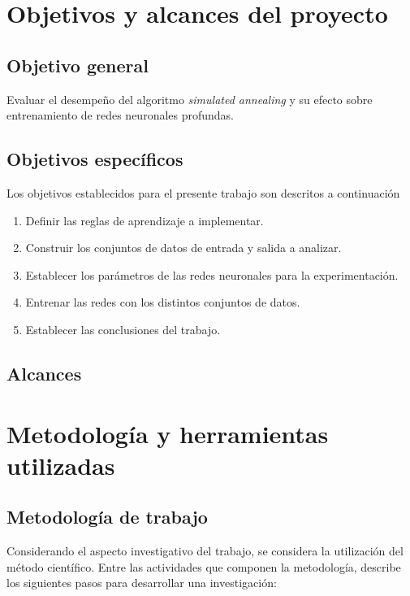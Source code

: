 \section{Objetivos y alcances del proyecto}
\subsection{Objetivo general}
Evaluar el desempeño del algoritmo {\em simulated annealing} y su efecto sobre entrenamiento de redes neuronales profundas.

\subsection{Objetivos específicos}
Los objetivos establecidos para el presente trabajo son descritos a continuación
\begin{enumerate}
    \item Definir las reglas de aprendizaje a implementar.
    \item Construir los conjuntos de datos de entrada y salida a analizar.
	\item Establecer los parámetros de las redes neuronales para la experimentación.
	\item Entrenar las redes con los distintos conjuntos de datos.
    \item Establecer las conclusiones del trabajo.
\end{enumerate}

\subsection{Alcances}

\section{Metodología y herramientas utilizadas}
\subsection{Metodología de trabajo}
Considerando el aspecto investigativo del trabajo, se considera la utilización del método científico. Entre las actividades que componen la metodología,  describe los siguientes pasos para desarrollar una investigación:

